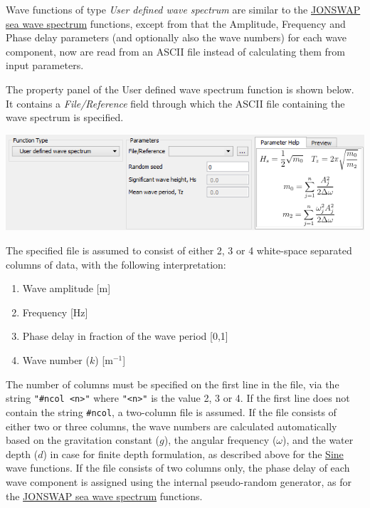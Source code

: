 
Wave functions of type {\sl User defined wave spectrum} are similar to the
\protect\hyperlink{jonswap-sea-wave-spectrum}{JONSWAP sea wave spectrum}
functions, except from that the Amplitude, Frequency and Phase delay parameters
(and optionally also the wave numbers) for each wave component, now are
read from an ASCII file instead of calculating them from input parameters.

The property panel of the User defined wave spectrum function is shown below.
It contains a {\sl File/Reference} field through which the ASCII file
containing the wave spectrum is specified.

\noindent\includegraphics[width=\textwidth]{Figures/4a-WaveSpectrumFromFile}

The specified file is assumed to consist of either 2, 3 or 4 white-space
separated columns of data, with the following interpretation:

\begin{enumerate}
\item Wave amplitude [m]
\item Frequency [Hz]
\item Phase delay in fraction of the wave period [0,1]
\item Wave number ($k$) [m$^{-1}$]
\end{enumerate}

The number of columns must be specified on the first line in the file,
via the string {\tt"\#ncol <n>"} where {\tt"<n>"} is the value 2, 3 or 4.
If the first line does not contain the string {\tt\#ncol}, a two-column file
is assumed. If the file consists of either two or three columns,
the wave numbers are calculated automatically based on the gravitation constant
($g$), the angular frequency ($\omega$), and the water depth ($d$) in case for
finite depth formulation, as described above for the
\protect\hyperlink{sine-wave}{Sine} wave functions.
If the file consists of two columns only, the phase delay of each wave component
is assigned using the internal pseudo-random generator, as for the
\protect\hyperlink{jonswap-sea-wave-spectrum}{JONSWAP sea wave spectrum}
functions.

